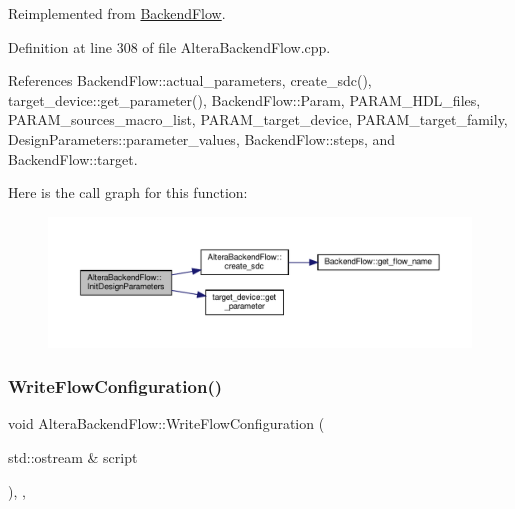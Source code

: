 Reimplemented from \hyperlink{classBackendFlow_a367d9917dc257ed6aa0bb5e97f57d2d4}{Backend\+Flow}.



Definition at line 308 of file Altera\+Backend\+Flow.\+cpp.



References Backend\+Flow\+::actual\+\_\+parameters, create\+\_\+sdc(), target\+\_\+device\+::get\+\_\+parameter(), Backend\+Flow\+::\+Param, P\+A\+R\+A\+M\+\_\+\+H\+D\+L\+\_\+files, P\+A\+R\+A\+M\+\_\+sources\+\_\+macro\+\_\+list, P\+A\+R\+A\+M\+\_\+target\+\_\+device, P\+A\+R\+A\+M\+\_\+target\+\_\+family, Design\+Parameters\+::parameter\+\_\+values, Backend\+Flow\+::steps, and Backend\+Flow\+::target.

Here is the call graph for this function\+:
\nopagebreak
\begin{figure}[H]
\begin{center}
\leavevmode
\includegraphics[width=350pt]{d2/d83/classAlteraBackendFlow_aef7d0e07aaf000ba9d93cdde6761daeb_cgraph}
\end{center}
\end{figure}
\mbox{\label{classAlteraBackendFlow_a4138bec7596448fb21b796dd31e65d6f}} 
\subsubsection{\texorpdfstring{Write\+Flow\+Configuration()}{WriteFlowConfiguration()}}
{\footnotesize\ttfamily void Altera\+Backend\+Flow\+::\+Write\+Flow\+Configuration (\begin{DoxyParamCaption}\item[{std\+::ostream \&}]{script }\end{DoxyParamCaption})\hspace{0.3cm}{\ttfamily [override]}, {\ttfamily [private]}, {\ttfamily [virtual]}}



